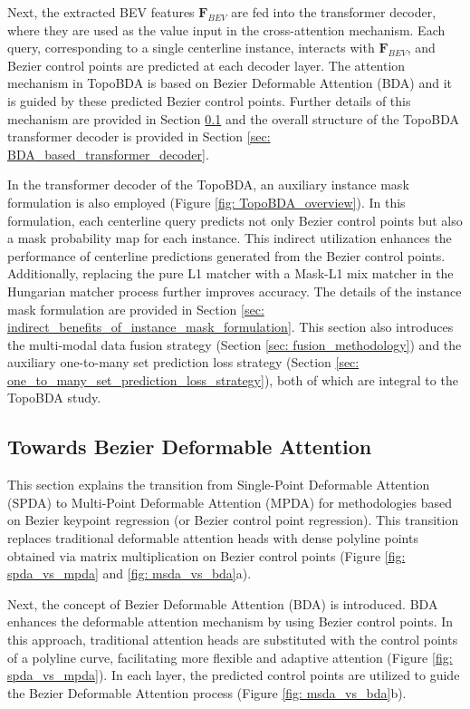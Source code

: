 Next, the extracted BEV features $\mathbf{F}_{BEV}$ are fed into the transformer decoder, where they are used as the value input in the cross-attention mechanism. Each query, corresponding to a single centerline instance, interacts with $\mathbf{F}_{BEV}$, and Bezier control points are predicted at each decoder layer. The attention mechanism in TopoBDA is based on Bezier Deformable Attention (BDA) and it is guided by these predicted Bezier control points. Further details of this mechanism are provided in Section \ref{sec: towards_bezier_deformable_attention} and the overall structure of the TopoBDA transformer decoder is provided in Section \ref{sec: BDA_based_transformer_decoder}. 

In the transformer decoder of the TopoBDA, an auxiliary instance mask formulation is also employed (Figure \ref{fig: TopoBDA_overview}). In this formulation, each centerline query predicts not only Bezier control points but also a mask probability map for each instance. This indirect utilization enhances the performance of centerline predictions generated from the Bezier control points. Additionally, replacing the pure L1 matcher with a Mask-L1 mix matcher in the Hungarian matcher process further improves accuracy. The details of the instance mask formulation are provided in Section \ref{sec: indirect_benefits_of_instance_mask_formulation}. This section also introduces the multi-modal data fusion strategy (Section \ref{sec: fusion_methodology}) and the auxiliary one-to-many set prediction loss strategy (Section \ref{sec: one_to_many_set_prediction_loss_strategy}), both of which are integral to the TopoBDA study.



\subsection{Towards Bezier Deformable Attention}
\label{sec: towards_bezier_deformable_attention}

This section explains the transition from Single-Point Deformable Attention (SPDA) to Multi-Point Deformable Attention (MPDA) for methodologies based on Bezier keypoint regression (or Bezier control point regression). This transition replaces traditional deformable attention heads with dense polyline points obtained via matrix multiplication on Bezier control points (Figure \ref{fig: spda_vs_mpda} and \ref{fig: msda_vs_bda}a). 

Next, the concept of Bezier Deformable Attention (BDA) is introduced. BDA enhances the deformable attention mechanism by using Bezier control points. In this approach, traditional attention heads are substituted with the control points of a polyline curve, facilitating more flexible and adaptive attention (Figure \ref{fig: spda_vs_mpda}). In each layer, the predicted control points are utilized to guide the Bezier Deformable Attention process (Figure \ref{fig: msda_vs_bda}b).

